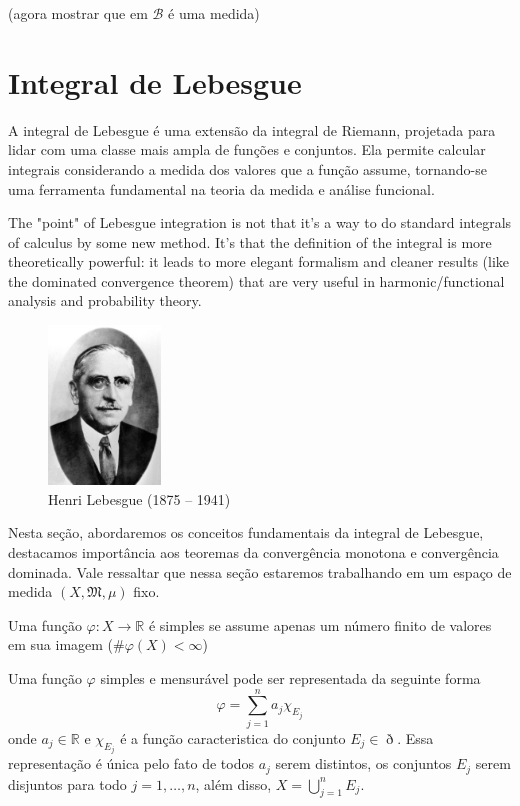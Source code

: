 \documentclass[a4paper, 11pt]{book}
\theoremstyle{definition}
\newcommand{\bR}{\mathbb{R}}
\newcommand{\cB}{\mathcal{B}}
\begin{document}
(agora mostrar que em $\cB$ é uma medida)

\section{Integral de Lebesgue}

A integral de Lebesgue é uma extensão da integral de Riemann, projetada para lidar com uma classe mais ampla de funções e conjuntos. Ela permite calcular integrais considerando a medida dos valores que a função assume, tornando-se uma ferramenta fundamental na teoria da medida e análise funcional.

The "point" of Lebesgue integration is not that it's a way to do standard integrals of calculus by some new method. It's that the definition of the integral is more theoretically powerful: it leads to more elegant formalism and cleaner results (like the dominated convergence theorem) that are very useful in harmonic/functional analysis and probability theory. 

\begin{figure}
    \centering
    \includegraphics[width=3cm]{lebesgue.jpeg}
    \caption{Henri Lebesgue (1875 -- 1941)}
\end{figure}

Nesta seção, abordaremos os conceitos fundamentais da integral de Lebesgue, destacamos importância aos teoremas da convergência monotona e convergência dominada.
Vale ressaltar que nessa seção estaremos trabalhando em um espaço de medida $(X, \mathfrak{M}, \mu)$ fixo.

\begin{dbox}
    Uma função $\varphi : X \to \bR$ é simples se assume apenas um número finito de valores em sua imagem ($\# \varphi(X) < \infty$)
\end{dbox}

Uma função $\varphi$ simples e mensurável pode ser representada da seguinte forma
\begin{equation} \label{eq:representacaopadrao}
    \varphi = \sum_{j = 1}^n a_j \chi_{E_j}
\end{equation}
onde $a_j \in \bR$ e $\chi_{E_j}$ é a função caracteristica do conjunto $E_j \in \eth$. Essa representação é única pelo fato de todos $a_j$ serem distintos, os conjuntos $E_j$ serem disjuntos para todo $j = 1,\dots,n$, além disso, $X = \bigcup_{j=1}^n E_j$.    
\end{document}

